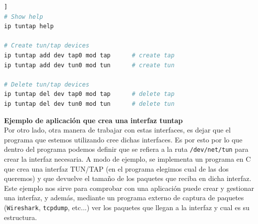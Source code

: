 \documentclass[12pt]{article}
\begin{document}
	\vspace{10px}

	\begin{lstlisting}[language=Bash, label=lst: ej2 tuntap ip, caption=Ejemplo de uso de \texttt{ip} para controlar interfaces TUN/TAP [\ref{bib: tunctl + ip}]]
# Show help
ip tuntap help

# Create tun/tap devices
ip tuntap add dev tap0 mod tap		# create tap
ip tuntap add dev tun0 mod tun		# create tun

# Delete tun/tap devices
ip tuntap del dev tap0 mod tap		# delete tap
ip tuntap del dev tun0 mod tun		# delete tun
	\end{lstlisting}

	\pagebreak
	
	\noindent \textbf{\large Ejemplo de aplicación que crea una interfaz tuntap}\\

	\noindent Por otro lado, otra manera de trabajar con estas interfaces, es dejar que el programa que estemos utilizando cree dichas interfaces. Es por esto por lo que dentro del programa podemos definir que se refiera a la ruta \texttt{/dev/net/tun} para crear la interfaz necesaria. A modo de ejemplo, se implementa un programa en C que crea una interfaz TUN/TAP (en el programa elegimos cual de las dos queremos) y que devuelve el tamaño de los paquetes que reciba en dicha interfaz. Este ejemplo nos sirve para comprobar con una aplicación puede crear y gestionar una interfaz, y además, mediante un programa externo de captura de paquetes (\texttt{Wireshark}, \texttt{tcpdump}, etc...) ver los paquetes que llegan a la interfaz y cual es su estructura. \\
	
\end{document}
